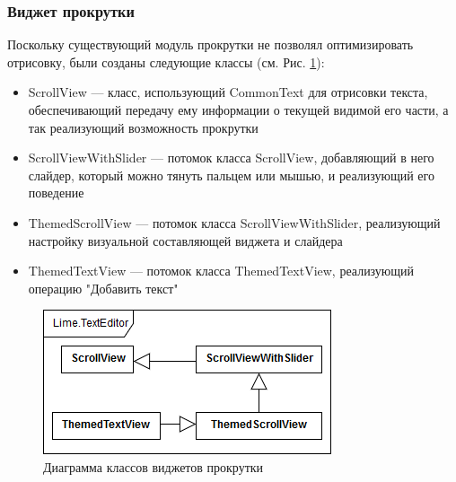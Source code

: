 \documentclass{fefu}
\begin{document}
			\subsubsection{Виджет прокрутки}
				\par Поскольку существующий модуль прокрутки не позволял оптимизировать
				отрисовку, были созданы следующие классы (см. Рис. \ref{diag:ScrollView}):
				\begin{itemize}
					\item ScrollView --- класс, использующий CommonText для отрисовки текста,
					обеспечивающий передачу ему информации о текущей видимой его части, а так
					реализующий возможность прокрутки
					\item ScrollViewWithSlider --- потомок класса ScrollView, добавляющий в 
					него слайдер, который можно тянуть пальцем или мышью, и реализующий его
					поведение
					\item ThemedScrollView --- потомок класса ScrollViewWithSlider,
					реализующий настройку визуальной составляющей виджета и слайдера
					\item ThemedTextView --- потомок класса ThemedTextView, реализующий 
					операцию "Добавить текст"
				\end{itemize}
				\begin{figure}[H]
					\centering
					\includegraphics[width=0.7\linewidth]{diagrams/ScrollView.png}
					\caption{Диаграмма классов виджетов прокрутки}
					\label{diag:ScrollView}
				\end{figure}
\end{document}
